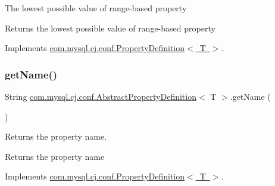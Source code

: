 The lowest possible value of range-\/based property

\begin{DoxyReturn}{Returns}
the lowest possible value of range-\/based property 
\end{DoxyReturn}


Implements \mbox{\hyperlink{interfacecom_1_1mysql_1_1cj_1_1conf_1_1_property_definition_aa5c2d6bf96e66cccf887454f038806bc}{com.\+mysql.\+cj.\+conf.\+Property\+Definition$<$ T $>$}}.

\mbox{\label{classcom_1_1mysql_1_1cj_1_1conf_1_1_abstract_property_definition_a7b5a7c72c029a0d0b25658f61f2bca01}} 
\subsubsection{\texorpdfstring{get\+Name()}{getName()}}
{\footnotesize\ttfamily String \mbox{\hyperlink{classcom_1_1mysql_1_1cj_1_1conf_1_1_abstract_property_definition}{com.\+mysql.\+cj.\+conf.\+Abstract\+Property\+Definition}}$<$ T $>$.get\+Name (\begin{DoxyParamCaption}{ }\end{DoxyParamCaption})}

Returns the property name.

\begin{DoxyReturn}{Returns}
the property name 
\end{DoxyReturn}


Implements \mbox{\hyperlink{interfacecom_1_1mysql_1_1cj_1_1conf_1_1_property_definition_a3d5fc7338338459e82d187c1255a67af}{com.\+mysql.\+cj.\+conf.\+Property\+Definition$<$ T $>$}}.

\mbox{\label{classcom_1_1mysql_1_1cj_1_1conf_1_1_abstract_property_definition_ace6e9092bf122ffc61f14b1893cb2d22}} 
